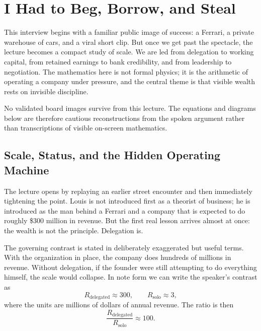 \chapter{I Had to Beg, Borrow, and Steal}

This interview begins with a familiar public image of success: a Ferrari, a private warehouse of cars, and a viral short clip. But once we get past the spectacle, the lecture becomes a compact study of scale. We are led from delegation to working capital, from retained earnings to bank credibility, and from leadership to negotiation. The mathematics here is not formal physics; it is the arithmetic of operating a company under pressure, and the central theme is that visible wealth rests on invisible discipline.

\begin{remark}
No validated board images survive from this lecture. The equations and diagrams below are therefore cautious reconstructions from the spoken argument rather than transcriptions of visible on-screen mathematics.
\end{remark}

\section{Scale, Status, and the Hidden Operating Machine}

The lecture opens by replaying an earlier street encounter and then immediately tightening the point. Louis is not introduced first as a theorist of business; he is introduced as the man behind a Ferrari and a company that is expected to do roughly \$300 million in revenue. But the first real lesson arrives almost at once: the wealth is not the principle. Delegation is.

The governing contrast is stated in deliberately exaggerated but useful terms. With the organization in place, the company does hundreds of millions in revenue. Without delegation, if the founder were still attempting to do everything himself, the scale would collapse. In note form we can write the speaker's contrast as
\begin{equation}
R_{\mathrm{delegated}} \approx 300,\qquad R_{\mathrm{solo}} \approx 3,
\end{equation}
where the units are millions of dollars of annual revenue. The ratio is then
\begin{equation}
\frac{R_{\mathrm{delegated}}}{R_{\mathrm{solo}}} \approx 100.
\end{equation}


